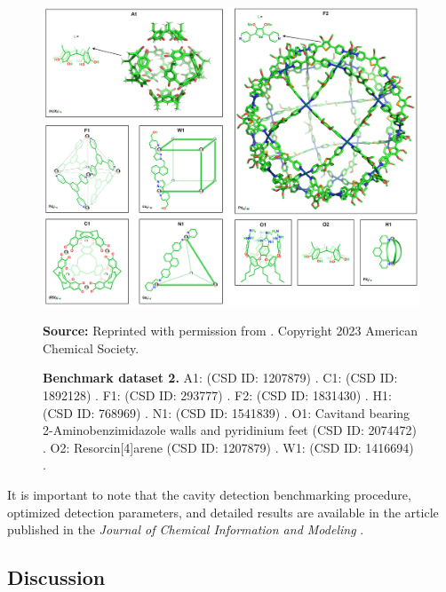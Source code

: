 \documentclass[Ingles]{phdthesis}
\begin{document}
\begin{figure}
  \centerline{\includegraphics[scale=0.9]{images/benchmark-dataset-2.png}}
  \centerline{\tiny{\textbf{Source:} Reprinted with permission from \cite{guerra2023B}. Copyright 2023 American Chemical Society.}}
  \caption[Benchmark dataset 2]{\textbf{Benchmark dataset 2.}
  A1:  (CSD ID: 1207879) \cite{macgillivray1997}.
  C1:  (CSD ID: 1892128) \cite{kawakami2019}.
  F1:  (CSD ID: 293777) \cite{yoshizawa2006}.
  F2:  (CSD ID: 1831430) \cite{fujita2016}.
  H1:  (CSD ID: 768969) \cite{liao2010}.
  N1:  (CSD ID: 1541839) \cite{ronson2017}.
  O1: Cavitand bearing 2-Aminobenzimidazole walls and pyridinium feet (CSD ID: 2074472) \cite{zhang2021}.
  O2: Resorcin[4]arene (CSD ID: 1207879) \cite{macgillivray1997}.
  W1:  (CSD ID: 1416694) \cite{cullen2016}.}
  \label{fig:benchmark-dataset-2}
\end{figure}

It is important to note that the cavity detection benchmarking procedure, optimized detection parameters, and detailed results are available in the article published in the \textit{Journal of Chemical Information and Modeling} \cite{guerra2023B}. 

\subsection{Discussion}
\end{document}
